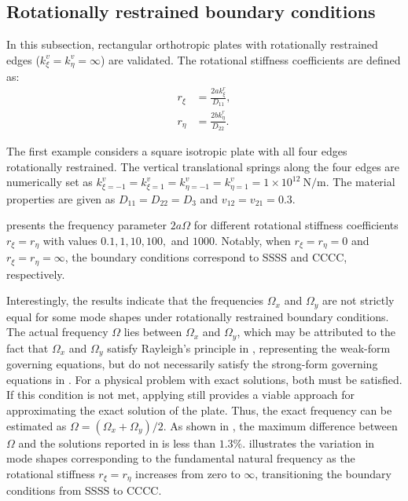 \documentclass[preprint,12pt]{elsarticle}
\newcommand{\ustif}{~\unit{\newton\per\metre}\xspace}
\begin{document}
\subsection{Rotationally restrained boundary conditions}
In this subsection, rectangular orthotropic plates with rotationally restrained edges (\(k^v_\xi = k^v_\eta = \infty\)) are validated.  
The rotational stiffness coefficients are defined as: 
% 
\begin{subequations}\label{eq:rotation_coex}
	\begin{align}
		r_{\xi} &= \frac{2a k^r_{\xi}}{D_{11}}, \\
		r_{\eta} &= \frac{2b k^r_{\eta}}{D_{22}}.
	\end{align}
\end{subequations}


The first example considers a square isotropic plate with all four edges rotationally restrained. The vertical translational springs along the four edges are numerically set as \( k^v_{\xi=-1} = k^v_{\xi=1} = k^v_{\eta=-1} = k^v_{\eta=1} = 1 \times 10^{12} \ustif \). The material properties are given as \( D_{11} = D_{22} = D_3 \) and \( v_{12} = v_{21} = 0.3 \).  

 presents the frequency parameter \( 2a\Omega \) for different rotational stiffness coefficients \( r_{\xi} = r_{\eta} \) with values \( 0.1, 1, 10, 100, \) and \( 1000 \).  
Notably, when \( r_{\xi} = r_{\eta} = 0 \) and \( r_{\xi} = r_{\eta} = \infty \), the boundary conditions correspond to SSSS and CCCC, respectively.  

Interestingly, the results indicate that the frequencies \(\Omega_x\) and \(\Omega_y\) are not strictly equal for some mode shapes under rotationally restrained boundary conditions.  
The actual frequency \(\Omega\) lies between \(\Omega_x\) and \(\Omega_y\), which may be attributed to the fact that \(\Omega_x\) and \(\Omega_y\) satisfy Rayleigh’s principle in , representing the weak-form governing equations, but do not necessarily satisfy the strong-form governing equations in .
For a physical problem with exact solutions, both  must be satisfied.  
If this condition is not met, applying  still provides a viable approach for approximating the exact solution of the plate.  
Thus, the exact frequency can be estimated as \(\Omega = (\Omega_x + \Omega_y)/2\).  
As shown in , the maximum difference between \(\Omega\) and the solutions reported in  is less than \(1.3\%\).
 illustrates the variation in mode shapes corresponding to the fundamental natural frequency as the rotational stiffness \(r_{\xi} = r_{\eta}\) increases from zero to \(\infty\), transitioning the boundary conditions from SSSS to CCCC.
\end{document}
